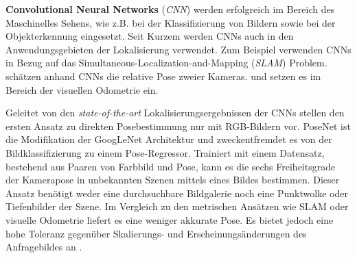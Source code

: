 \textbf{Convolutional Neural Networks} (\textit{CNN}) werden erfolgreich im Bereich des Maschinelles Sehens, wie z.B. bei der Klassifizierung von Bildern \cite{krizhevskyImageNetClassificationDeep2012, simonyanVeryDeepConvolutional2014, heDeepResidualLearning2015} sowie bei der Objekterkennung \cite{girshickRichFeatureHierarchies2013, renFasterRCNNRealTime2015b, girshickFastRCNN2015} eingesetzt. 
Seit Kurzem werden CNNs auch in den Anwendungsgebieten der Lokalisierung verwendet. Zum Beispiel verwenden  \citet{parisottoGlobalPoseEstimation2018} CNNs in Bezug auf das Simultaneous-Localization-and-Mapping (\textit{SLAM}) Problem. \citet{melekhovRelativeCameraPose2017} schätzen anhand CNNs die relative Pose zweier Kameras. \citet{costanteExploringRepresentationLearning2016} und \citet{wangDeepVOEndtoendVisual2017} setzen es im Bereich der visuellen Odometrie ein.

Geleitet von den \textit{state-of-the-art} Lokalisierungsergebnissen der CNNs stellen \citet{kendallPoseNetConvolutionalNetwork2015} den ersten Ansatz zu direkten Posebestimmung nur mit RGB-Bildern vor. PoseNet ist die Modifikation der GoogLeNet \cite{szegedyGoingDeeperConvolutions2015} Architektur und zweckentfremdet es von der Bildklassifizierung zu einem Pose-Regressor. Trainiert mit einem Datensatz, bestehend aus Paaren von Farbbild und Pose, kann es die sechs Freiheitsgrade der Kamerapose in unbekannten Szenen mittels eines Bildes bestimmen. Dieser Ansatz benötigt weder eine durchsuchbare Bildgalerie noch eine Punktwolke oder Tiefenbilder der Szene. Im Vergleich zu den metrischen Ansätzen wie SLAM oder visuelle Odometrie liefert es eine weniger akkurate Pose. Es bietet jedoch eine hohe Toleranz gegenüber Skalierungs- und Erscheinungsänderungen des Anfragebildes an \cite{piascoSurveyVisualBasedLocalization2018}.

